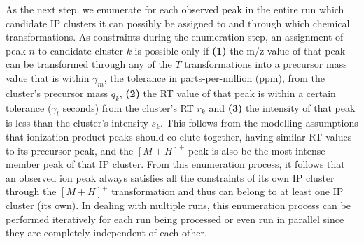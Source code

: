 As the next step, we enumerate for each observed peak in the entire run which candidate IP clusters it can possibly be assigned to and through which chemical transformations. As constraints during the enumeration step, an assignment of peak $n$ to candidate cluster $k$ is possible only if \textbf{(1)} the m/z value of that peak can be transformed through any of the $T$ transformations into a precursor mass value that is within $\gamma_m$, the tolerance in parts-per-million (ppm), from the cluster's precursor mass $q_k$, \textbf{(2)} the RT value of that peak is within a certain tolerance ($\gamma_t$ seconds) from the cluster's RT $r_k$ and \textbf{(3)} the intensity of that peak is less than the cluster's intensity $s_k$. This follows from the modelling assumptions that ionization product peaks should co-elute together, having similar RT values to its precursor peak, and the $[M+H]^+$ peak is also be the most intense member peak of that IP cluster. From this enumeration process, it follows that an observed ion peak always satisfies all the constraints of its own IP cluster through the $[M+H]^+$ transformation and thus can belong to at least one IP cluster (its own). In dealing with multiple runs, this enumeration process can be performed iteratively for each run being processed or even run in parallel since they are completely independent of each other. 

